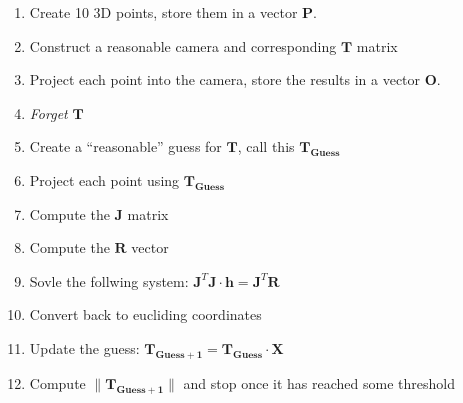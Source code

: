 \documentclass{article}
\begin{document}
\begin{enumerate}
\item Create 10 3D points, store them in a vector $\mathbf{P}$.
\item Construct a reasonable camera and corresponding $\mathbf{T}$
  matrix
\item Project each point into the camera, store the results in a vector
  $\mathbf{O}$.
\item \emph{Forget} $\mathbf{T}$
\item Create a ``reasonable'' guess for $\mathbf{T}$, call this $\mathbf{T_{Guess}}$
\item Project each point using $\mathbf{T_{Guess}}$
\item Compute the $\mathbf{J}$ matrix
\item Compute the $\mathbf{R}$ vector
\item Sovle the follwing system: $\mathbf{J}^T\mathbf{J}\cdot\mathbf{h} =
  \mathbf{J}^T\mathbf{R}$
\item Convert back to eucliding coordinates
\item Update the guess: $\mathbf{T_{Guess + 1}} = \mathbf{T_{Guess}}
  \cdot \mathbf{X}$
\item Compute $\|\mathbf{T_{Guess + 1}}\|$ and stop once it has
  reached some threshold
\end{enumerate}



\end{document}
